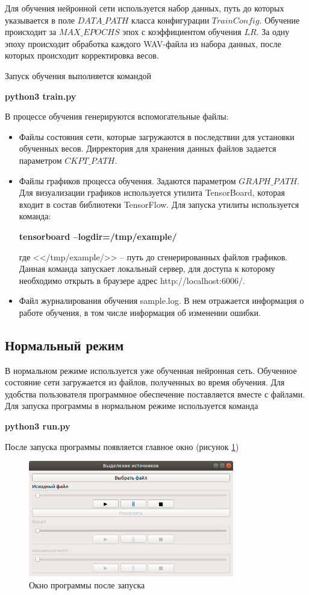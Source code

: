 Для обучения нейронной сети используется набор данных, путь до которых указывается в поле $DATA\_PATH$ класса конфигурации $TrainConfig$. Обучение происходит за $MAX\_EPOCHS$ эпох с коэффициентом обучения $LR$. За одну эпоху происходит обработка каждого WAV-файла из набора данных, после которых происходит корректировка весов.

Запуск обучения выполняется командой

\textbf{python3 train.py}

В процессе обучения генерируются вспомогательные файлы:
\begin{itemize}
	\item Файлы состояния сети, которые загружаются в последствии для установки обученных весов. Дирректория для хранения данных файлов задается параметром $CKPT\_PATH$.
	\item Файлы графиков процесса обучения. Задаются параметром $GRAPH\_PATH$. Для визуализации графиков используется утилита TensorBoard, которая входит в состав библиотеки TensorFlow. Для запуска утилиты используется команда:
	
	\textbf{tensorboard --logdir=/tmp/example/}
	
	где <</tmp/example/>> -- путь до сгенерированных файлов графиков. Данная команда запускает локальный сервер, для доступа к которому необходимо открыть в браузере адрес http://localhost:6006/.
	
	\item Файл журналирования обучения sample.log. В нем отражается информация о работе обучения, в том числе информация об изменении ошибки.
	
\end{itemize}
 
\subsection{Нормальный режим}

В нормальном режиме используется уже обученная нейронная сеть. Обученное состояние сети загружается из файлов, полученных во время обучения. Для удобства пользователя программное обеспечение поставляется вместе с файлами. Для запуска программы в нормальном режиме используется команда

\textbf{python3 run.py}

После запуска программы появляется главное окно (рисунок \ref{imp:main-window})

\begin{figure}
	\centering
	\includegraphics[width=0.8\textwidth]{inc/img/prog-main}
	\caption{Окно программы после запуска}
	\label{imp:main-window}
\end{figure}

